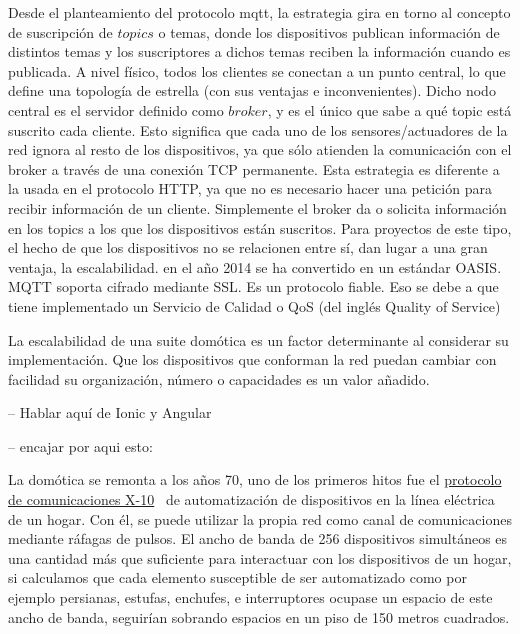 Desde el planteamiento del protocolo \gls{mqtt}, la estrategia gira en torno al concepto de suscripción de $topics$ o temas, donde los dispositivos publican información de distintos temas y los suscriptores a dichos temas reciben la información cuando es publicada. A nivel físico, todos los clientes se conectan a un punto central, lo que define una topología de estrella (con sus ventajas e inconvenientes). Dicho nodo central es el servidor definido como $broker$, y es el único que sabe a qué topic está suscrito cada cliente. Esto significa que cada uno de los sensores/actuadores de la red ignora al resto de los dispositivos, ya que sólo atienden la comunicación con el broker a través de una conexión TCP permanente. Esta estrategia es diferente a la usada en el protocolo HTTP, ya que no es necesario hacer una petición para recibir información de un cliente. Simplemente el broker da o solicita información en los topics a los que los dispositivos están suscritos. Para proyectos de este tipo, el hecho de que los dispositivos no se relacionen entre sí, dan lugar a una gran ventaja, la escalabilidad. en el año 2014 se ha convertido en un estándar OASIS. MQTT soporta cifrado mediante SSL. Es un protocolo fiable. Eso se debe a que tiene implementado un Servicio de Calidad o QoS (del inglés Quality of Service)

\vspace{1.5cm}

La escalabilidad de una suite domótica es un factor determinante al considerar su implementación. Que los dispositivos que conforman la red puedan cambiar con facilidad su organización, número o capacidades es un valor añadido.

\vspace{1.5cm}

-- Hablar aquí de Ionic y Angular

-- encajar por aqui esto:

La domótica se remonta a los años 70, uno de los primeros hitos fue el \href{https://es.wikipedia.org/wiki/X10}{protocolo de comunicaciones X-10}~\cite{x10protocolwikipedia} de automatización de dispositivos en la línea eléctrica de un hogar. Con él, se puede utilizar la propia red como canal de comunicaciones mediante ráfagas de pulsos. El ancho de banda de 256 dispositivos simultáneos es una cantidad más que suficiente para interactuar con los dispositivos de un hogar, si calculamos que cada elemento susceptible de ser automatizado como por ejemplo persianas, estufas, enchufes, e interruptores ocupase un espacio de este ancho de banda, seguirían sobrando espacios en un piso de 150 metros cuadrados.

